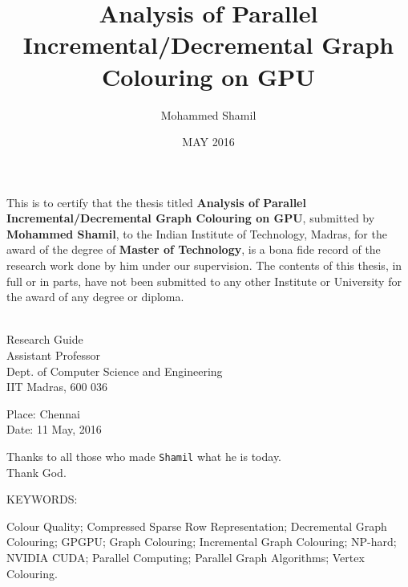 \documentclass[MTech]{iitmdiss}
\def\thesistitle{Analysis of Parallel Incremental/Decremental Graph Colouring on GPU}
\def\thesisauthor{Mohammed Shamil}
\begin{document}

\title{\thesistitle}

\author{\thesisauthor}

\date{MAY 2016}

\maketitle

\certificate

\vspace*{0.5in}

\noindent This is to certify that the thesis titled {\bf {\thesistitle}}, submitted by {\bf {\thesisauthor}}, 
  to the Indian Institute of Technology, Madras, for
the award of the degree of {\bf Master of Technology}, is a bona fide
record of the research work done by him under our supervision.  The
contents of this thesis, in full or in parts, have not been submitted
to any other Institute or University for the award of any degree or
diploma.

\vspace*{1.5in}
\hspace*{-0.25in}
\begin{singlespace}
 \\
\noindent Research Guide \\ 
\noindent Assistant Professor \\
\noindent Dept. of Computer Science and Engineering\\
\noindent IIT Madras, 600 036 \\
\end{singlespace}
\vspace*{0.25in}
\noindent Place: Chennai\\ 
Date: 11 May, 2016


\acknowledgements

Thanks to all those who made \verb+Shamil+ what he is today.
\\
Thank God.

\abstract

\noindent KEYWORDS: \hspace*{0.5em} \parbox[t]{4.4in}{Colour Quality; Compressed Sparse Row Representation; Decremental Graph Colouring; GPGPU; Graph Colouring; Incremental Graph Colouring; NP-hard; NVIDIA CUDA; Parallel Computing; Parallel Graph Algorithms; Vertex Colouring.}
\end{document}
